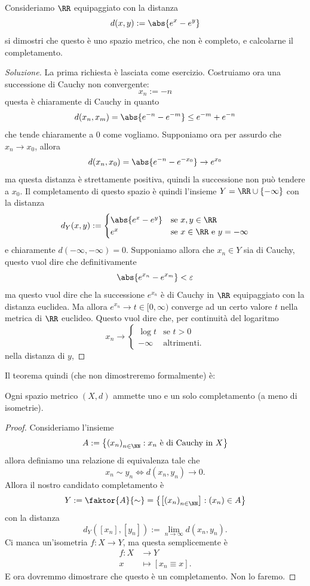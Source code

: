 \documentclass[11pt]{scrartcl}
\begin{document}
	\begin{exercise}
		Consideriamo $\RR$ equipaggiato con la distanza
		$$d(x,y):=\abs{e^x-e^y}$$
		si dimostri che questo è uno spazio metrico, che non è completo, e calcolarne il completamento.
	\end{exercise}
	\begin{proof}[Soluzione]
		La prima richiesta è lasciata come esercizio. Costruiamo ora una successione di Cauchy non convergente:
		$$x_n:=-n$$
		questa è chiaramente di Cauchy in quanto
		$$d(x_n,x_m)=\abs{e^{-n}-e^{-m}}\le e^{-m}+e^{-n}$$
		che tende chiaramente a $0$ come vogliamo. Supponiamo ora per assurdo che $x_n\to x_0$, allora
		$$d(x_n,x_0)=\abs{e^{-n}-e^{-x_0}}\to e^{x_0}$$ 
		ma questa distanza è strettamente positiva, quindi la successione non può tendere a $x_0$. Il completamento di questo spazio è quindi l'insieme $Y=\RR\cup \left\{-\infty\right\}$ con la distanza
		$$d_Y(x,y):=\begin{cases}
			\abs{e^x-e^y} & \text{se $x,y\in \RR$} \\
			e^x & \text{se $x\in \RR$ e $y=-\infty$}
		\end{cases}$$
		e chiaramente $d(-\infty,-\infty)=0$. Supponiamo allora che $x_n\in Y$ sia di Cauchy, questo vuol dire che definitivamente
		$$\abs{e^{x_n}-e^{x_m}}<\varepsilon$$
		ma questo vuol dire che la successione $e^{x_n}$ è di Cauchy in $\RR$ equipaggiato con la distanza euclidea. Ma allora $e^{x_n}\to t\in [0,\infty)$ converge ad un certo valore $t$ nella metrica di $\RR$ euclideo. Questo vuol dire che, per continuità del logaritmo
		$$
		x_n \to 
		\begin{cases}
			\log t & \text{se $t>0$ }\\
			-\infty & \text{altrimenti.}
		\end{cases}
		$$
		nella distanza di $y$,
	\end{proof}
	Il teorema quindi (che non dimostreremo formalmente) è:
	\begin{theorem}
		Ogni spazio metrico $(X,d)$ ammette uno e un solo completamento (a meno di isometrie).
	\end{theorem}
	\begin{proof}
		Consideriamo l'insieme 
		$$A:=\left\{\left(x_n\right)_{n\in\NN}:x_n \text{ è di Cauchy in $X$}\right\}$$
		allora definiamo una relazione di equivalenza tale che
		$$x_n\sim y_n \iff d(x_n,y_n)\to 0.$$
		Allora il nostro candidato completamento è
		$$Y:=\faktor{A}{\sim}=\left\{\left[\left(x_n\right)_{n\in\NN}\right]:\left(x_n\right)\in A\right\}$$
		con la distanza
		$$d_Y\left(\left[x_n\right],\left[y_n\right]\right):=\lim_{n\to\infty}d\left(x_n,y_n\right).$$
		Ci manca un'isometria $f:X\to Y$, ma questa semplicemente è 
		\begin{align*}
			f: X & \to Y \\
			x & \mapsto \left[x_n \equiv x\right].
		\end{align*}
		E ora dovremmo dimostrare che questo è un completamento. Non lo faremo.
	\end{proof}
\end{document}
